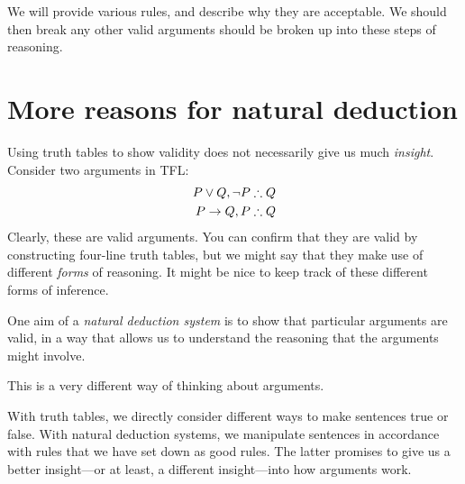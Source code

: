 We will provide various rules, and describe why they are acceptable. We should then break any other valid arguments should be broken up into these steps of reasoning.



\section{More reasons for natural deduction}


Using truth tables to show validity does not necessarily give us much \emph{insight}. Consider two arguments in TFL:
	\begin{align*}
		P \eor Q, \enot P & \therefore Q\\
		P \eif Q, P & \therefore Q
	\end{align*}
Clearly, these are valid arguments. You can confirm that they are valid by constructing four-line truth tables, but we might say that they make use of different \emph{forms} of reasoning. It might be nice to keep track of these different forms of inference.

One aim of a \emph{natural deduction system} is to show that particular arguments are valid, in a way that allows us to understand the reasoning that the arguments might involve.

{This is a very different way of thinking about arguments.}

With truth tables, we directly consider different ways to make sentences true or false. With natural deduction systems, we manipulate sentences in accordance with rules that we have set down as good rules. The latter promises to give us a better insight---or at least, a different insight---into how arguments work.

